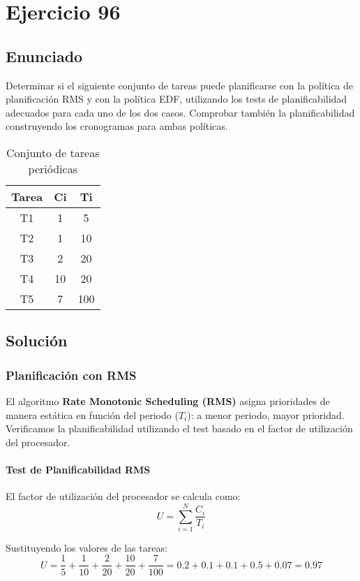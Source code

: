 \documentclass[a4paper,12pt]{article}
\begin{document}
\section{Ejercicio 96}
\subsection{Enunciado}
Determinar si el siguiente conjunto de tareas puede planificarse con la política de planificación RMS y con la política EDF, utilizando los tests de planificabilidad adecuados para cada uno de los dos casos. Comprobar también la planificabilidad construyendo los cronogramas para ambas políticas.

\begin{table}[H]
\centering
\begin{tabular}{|c|c|c|}
\hline
\textbf{Tarea} & \textbf{Ci} & \textbf{Ti} \\ \hline
T1 & 1 & 5 \\ \hline
T2 & 1 & 10 \\ \hline
T3 & 2 & 20 \\ \hline
T4 & 10 & 20 \\ \hline
T5 & 7 & 100 \\ \hline
\end{tabular}
\caption{Conjunto de tareas periódicas}
\end{table}

\subsection{Solución}
\subsubsection{Planificación con RMS}
El algoritmo \textbf{Rate Monotonic Scheduling (RMS)} asigna prioridades de manera estática en función del periodo (\(T_i\)): a menor periodo, mayor prioridad. Verificamos la planificabilidad utilizando el test basado en el factor de utilización del procesador.

\paragraph{Test de Planificabilidad RMS}
El factor de utilización del procesador se calcula como:
\[
U = \sum_{i=1}^N \frac{C_i}{T_i}
\]

Sustituyendo los valores de las tareas:
\[
U = \frac{1}{5} + \frac{1}{10} + \frac{2}{20} + \frac{10}{20} + \frac{7}{100} = 0.2 + 0.1 + 0.1 + 0.5 + 0.07 = 0.97
\]
\end{document}

